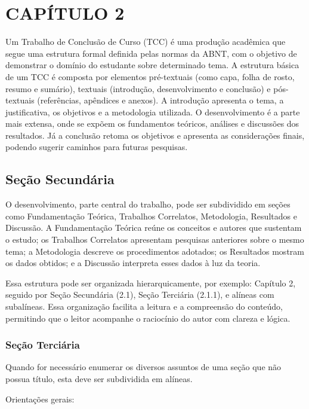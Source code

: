 \chapter{CAPÍTULO 2}

Um Trabalho de Conclusão de Curso (TCC) é uma produção acadêmica que segue uma estrutura formal definida pelas normas da ABNT, com o objetivo de demonstrar o domínio do estudante sobre determinado tema. A estrutura básica de um TCC é composta por elementos pré-textuais (como capa, folha de rosto, resumo e sumário), textuais (introdução, desenvolvimento e conclusão) e pós-textuais (referências, apêndices e anexos). A introdução apresenta o tema, a justificativa, os objetivos e a metodologia utilizada. O desenvolvimento é a parte mais extensa, onde se expõem os fundamentos teóricos, análises e discussões dos resultados. Já a conclusão retoma os objetivos e apresenta as considerações finais, podendo sugerir caminhos para futuras pesquisas.

\section{Seção Secundária}

O desenvolvimento, parte central do trabalho, pode ser subdividido em seções como Fundamentação Teórica, Trabalhos Correlatos, Metodologia, Resultados e Discussão. A Fundamentação Teórica reúne os conceitos e autores que sustentam o estudo; os Trabalhos Correlatos apresentam pesquisas anteriores sobre o mesmo tema; a Metodologia descreve os procedimentos adotados; os Resultados mostram os dados obtidos; e a Discussão interpreta esses dados à luz da teoria. 

Essa estrutura pode ser organizada hierarquicamente, por exemplo: Capítulo 2, seguido por Seção Secundária (2.1), Seção Terciária (2.1.1), e alíneas com subalíneas. Essa organização facilita a leitura e a compreensão do conteúdo, permitindo que o leitor acompanhe o raciocínio do autor com clareza e lógica.

\subsection{Seção Terciária}

Quando for necessário enumerar os diversos assuntos de uma seção que não
possua título, esta deve ser subdividida em alíneas.

Orientações gerais:

